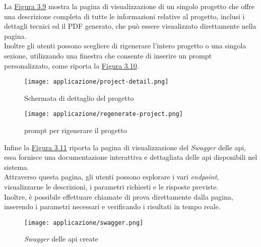 \pagebreak
\noindent La {\hyperref[fig:project-detail]{Figura 3.9}} mostra la pagina di visualizzazione di un singolo progetto che offre una descrizione completa di tutte le informazioni relative al progetto, inclusi i dettagli tecnici ed il PDF generato, che può essere visualizzato direttamente nella pagina. \\ 

\noindent Inoltre gli utenti possono scegliere di rigenerare l’intero progetto o una singola sezione, utilizzando una finestra che consente di inserire un \gls{prompt} personalizzato, come riporta la {\hyperref[fig:regenerate-project]{Figura 3.10}}.\\
\begin{figure}[H]
    \centering
    \texttt{[image: applicazione/project-detail.png]}
    \caption{Schermata di dettaglio del progetto}
    \label{fig:project-detail}
\end{figure}

\begin{figure}[H]
    \centering
    \texttt{[image: applicazione/regenerate-project.png]}
    \caption{\gls{prompt} per rigenerare il progetto}
    \label{fig:regenerate-project}
\end{figure}

\pagebreak
\noindent Infine la {\hyperref[fig:swagger]{Figura 3.11}} riporta la pagina di visualizzazione del \textit{Swagger} delle \gls{api}, essa fornisce una documentazione interattiva e dettagliata delle \gls{api} disponibili nel sistema. \\
Attraverso questa pagina, gli utenti possono esplorare i vari \textit{endpoint}, visualizzarne le descrizioni, i parametri richiesti e le risposte previste. \\
Inoltre, è possibile effettuare chiamate di prova direttamente dalla pagina, inserendo i parametri necessari e verificando i risultati in tempo reale. 
\begin{figure}[H]
    \centering
    \texttt{[image: applicazione/swagger.png]}
    \caption{\textit{Swagger} delle \gls{api} create}
    \label{fig:swagger}
\end{figure}